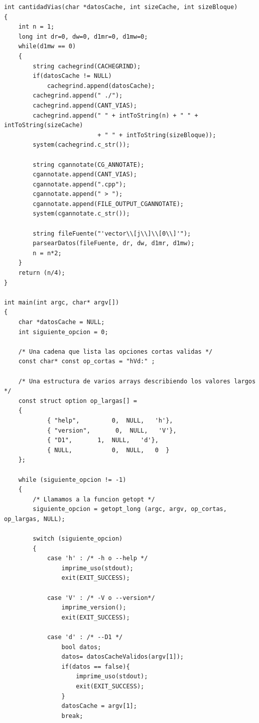 \documentclass[a4paper,10pt]{article}
\begin{document}
\begin{verbatim}
int cantidadVias(char *datosCache, int sizeCache, int sizeBloque)
{
    int n = 1;
    long int dr=0, dw=0, d1mr=0, d1mw=0;
    while(d1mw == 0)
    {
        string cachegrind(CACHEGRIND);
        if(datosCache != NULL)
            cachegrind.append(datosCache);
        cachegrind.append(" ./");
        cachegrind.append(CANT_VIAS);
        cachegrind.append(" " + intToString(n) + " " + intToString(sizeCache)
                          + " " + intToString(sizeBloque));
        system(cachegrind.c_str());

        string cgannotate(CG_ANNOTATE);
        cgannotate.append(CANT_VIAS);
        cgannotate.append(".cpp");
        cgannotate.append(" > ");
        cgannotate.append(FILE_OUTPUT_CGANNOTATE);
        system(cgannotate.c_str());

        string fileFuente("'vector\\[j\\]\\[0\\]'");
        parsearDatos(fileFuente, dr, dw, d1mr, d1mw);
        n = n*2;
    }
    return (n/4);
}

int main(int argc, char* argv[])
{
    char *datosCache = NULL;
    int siguiente_opcion = 0;

    /* Una cadena que lista las opciones cortas validas */
    const char* const op_cortas = "hVd:" ;

    /* Una estructura de varios arrays describiendo los valores largos */
    const struct option op_largas[] =
    {
            { "help",         0,  NULL,   'h'},
            { "version",       0,  NULL,   'V'},
            { "D1",       1,  NULL,   'd'},
            { NULL,           0,  NULL,   0  }
    };

    while (siguiente_opcion != -1)
    {
        /* Llamamos a la funcion getopt */
        siguiente_opcion = getopt_long (argc, argv, op_cortas, op_largas, NULL);

        switch (siguiente_opcion)
        {
            case 'h' : /* -h o --help */
                imprime_uso(stdout);
                exit(EXIT_SUCCESS);

            case 'V' : /* -V o --version*/
                imprime_version();
                exit(EXIT_SUCCESS);

            case 'd' : /* --D1 */
                bool datos;
                datos= datosCacheValidos(argv[1]);
                if(datos == false){
                    imprime_uso(stdout);
                    exit(EXIT_SUCCESS);
                }
                datosCache = argv[1];
                break;


\end{verbatim}
\end{document}
